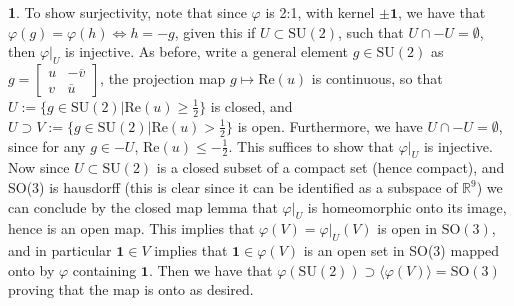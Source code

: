 \documentclass[10.5pt]{article}
\theoremstyle{definition}
\newtheorem{pb}{}
\newcommand{\set}[1]{\{#1\}}
\newcommand{\gen}[1]{\langle #1 \rangle}
\newcommand{\vp}{\varphi}
\begin{document}
\begin{pb}
        To show surjectivity, note that since \(\varphi\) is 2:1, with kernel \(\pm \mathbf{1}\), we have that \(\varphi(g) = \varphi(h) \iff h = -g\), given this
        if \(U \subset \text{SU}(2)\), such that \(U \cap -U = \emptyset\), then \(\varphi\vert_U\) is injective. As before, write a general element \(g \in \text{SU}(2)\) as 
        \(g = \begin{bmatrix} u & -\overline{v} \\ v & \overline{u} \end{bmatrix}\), the projection map \(g \mapsto \text{Re}(u)\) is continuous, so that 
        \(U := \set{g \in \text{SU}(2) \vert \text{Re}(u) \geq \frac{1}{2}}\) is closed, and \(U \supset V := \set{g \in \text{SU}(2) \vert \text{Re}(u) > \frac{1}{2}}\) is open.
        Furthermore, we have \(U \cap -U = \emptyset\), since for any \(g \in -U\), \(\text{Re}(u) \leq -\frac{1}{2}\). This suffices to show that \(\varphi\vert_U\) is injective.
        Now since \(U \subset \text{SU}(2)\) is a closed subset of a compact set (hence compact), and SO(3) is hausdorff (this is clear since it can be identified as a subspace of \(\mathbb{R}^9\))
        we can conclude by the closed map lemma that \(\varphi\vert_U\) is homeomorphic onto its image, hence is an open map. This implies that \(\varphi(V) = \varphi\vert_U (V)\) is open in
        \(\text{SO}(3)\), and in particular \(\mathbf{1} \in V\) implies that \(\mathbf{1} \in \varphi(V)\) is an open set in SO(3) mapped onto by \(\varphi\) containing \(\mathbf{1}\).
        Then we have that \(\vp(\text{SU}(2)) \supset \gen{\varphi(V)} = \text{SO}(3)\) proving that the map is onto as desired.
    \end{pb}
\end{document}
